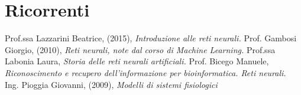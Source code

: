 \documentclass[12pt,a4paper,oneside]{book}
\begin{document}
	\chapter{Ricorrenti}

\clearpage 
\begin{thebibliography}{9} 
	 Prof.ssa Lazzarini Beatrice, (2015), \emph{Introduzione alle reti neurali.}
	 Prof. Gambosi Giorgio, (2010), \emph{Reti neurali, note dal corso di Machine Learning.}
	 Prof.ssa Labonia Laura, \emph{Storia delle reti neurali artificiali.}
	 Prof. Bicego Manuele, \emph{Riconoscimento e recupero dell’informazione per bioinformatica. Reti neurali.}
	 Ing. Pioggia Giovanni, (2009), \emph{Modelli di sistemi fisiologici}
 \end{thebibliography}
	
\end{document}
